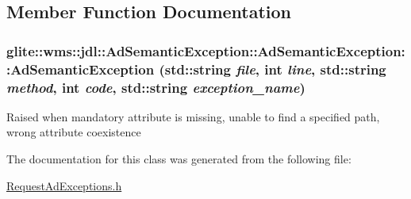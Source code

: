 \subsection{Member Function Documentation}
\hypertarget{classglite_1_1wms_1_1jdl_1_1AdSemanticException_a0}{
\subsubsection[AdSemanticException::AdSemanticException]{\setlength{\rightskip}{0pt plus 5cm}glite::wms::jdl::Ad\-Semantic\-Exception::Ad\-Semantic\-Exception::Ad\-Semantic\-Exception (std::string {\em file}, int {\em line}, std::string {\em method}, int {\em code}, std::string {\em exception\_\-name})}}
\label{classglite_1_1wms_1_1jdl_1_1AdSemanticException_a0}


Raised when mandatory attribute is missing, unable to find a specified path, wrong attribute coexistence 

The documentation for this class was generated from the following file:\begin{CompactItemize}
\item 
\hyperlink{RequestAdExceptions_8h}{Request\-Ad\-Exceptions.h}\end{CompactItemize}
